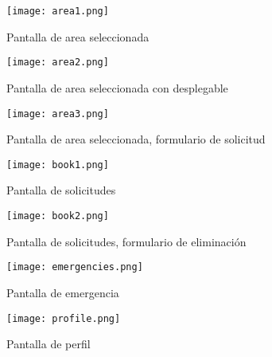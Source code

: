 \documentclass{article}
\begin{document}
    \begin{figure}[H]
        \centerline{\texttt{[image: area1.png]}}
        \caption{Pantalla de area seleccionada}
        \label{fig:area1}
    \end{figure}

    \begin{figure}[H]
        \centerline{\texttt{[image: area2.png]}}
        \caption{Pantalla de area seleccionada con desplegable}
        \label{fig:area2}
    \end{figure}

    \begin{figure}[H]
        \centerline{\texttt{[image: area3.png]}}
        \caption{Pantalla de area seleccionada, formulario de solicitud}
        \label{fig:area3}
    \end{figure}

    \begin{figure}[H]
        \centerline{\texttt{[image: book1.png]}}
        \caption{Pantalla de solicitudes}
        \label{fig:book1}
    \end{figure}

    \begin{figure}[H]
        \centerline{\texttt{[image: book2.png]}}
        \caption{Pantalla de solicitudes, formulario de eliminación}
        \label{fig:book2}
    \end{figure}

    \begin{figure}[H]
        \centerline{\texttt{[image: emergencies.png]}}
        \caption{Pantalla de emergencia}
        \label{fig:emergencies}
    \end{figure}

    \begin{figure}[H]
        \centerline{\texttt{[image: profile.png]}}
        \caption{Pantalla de perfil}
        \label{fig:profile}
    \end{figure}
\end{document}
